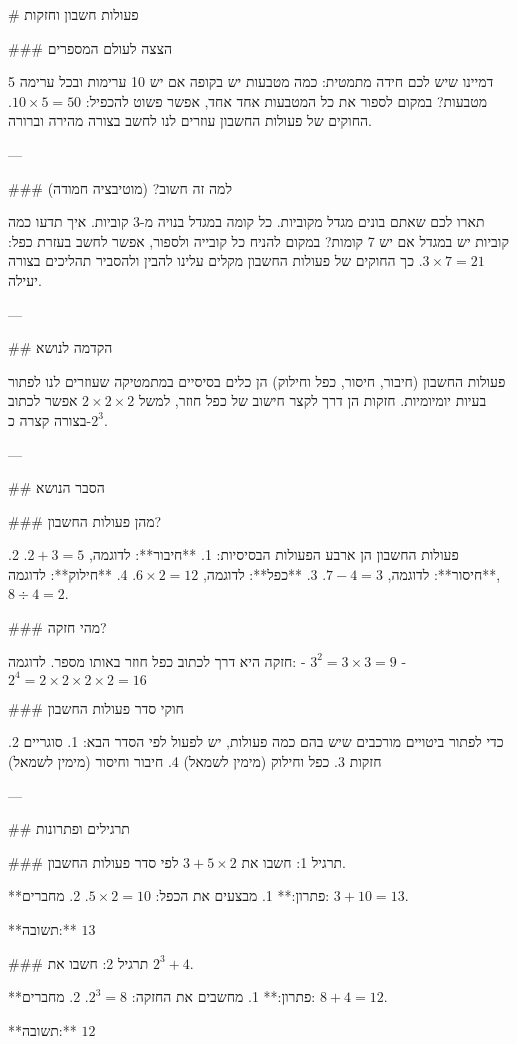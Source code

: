 # פעולות חשבון וחזקות

### הצצה לעולם המספרים

דמיינו שיש לכם חידה מתמטית: כמה מטבעות יש בקופה אם יש 10 ערימות ובכל ערימה 5 מטבעות? במקום לספור את כל המטבעות אחד אחד, אפשר פשוט להכפיל: $10 \times 5 = 50$. החוקים של פעולות החשבון עוזרים לנו לחשב בצורה מהירה וברורה.

---

### למה זה חשוב? (מוטיבציה חמודה)

תארו לכם שאתם בונים מגדל מקוביות. כל קומה במגדל בנויה מ-3 קוביות. איך תדעו כמה קוביות יש במגדל אם יש 7 קומות? במקום להניח כל קובייה ולספור, אפשר לחשב בעזרת כפל: $3 \times 7 = 21$. כך החוקים של פעולות החשבון מקלים עלינו להבין ולהסביר תהליכים בצורה יעילה.

---

## הקדמה לנושא

פעולות החשבון (חיבור, חיסור, כפל וחילוק) הן כלים בסיסיים במתמטיקה שעוזרים לנו לפתור בעיות יומיומיות. חזקות הן דרך לקצר חישוב של כפל חוזר, למשל $2 \times 2 \times 2$ אפשר לכתוב בצורה קצרה כ-$2^3$.

---

## הסבר הנושא

### מהן פעולות החשבון?

פעולות החשבון הן ארבע הפעולות הבסיסיות:
1. **חיבור**: לדוגמה, $2 + 3 = 5$.
2. **חיסור**: לדוגמה, $7 - 4 = 3$.
3. **כפל**: לדוגמה, $6 \times 2 = 12$.
4. **חילוק**: לדוגמה, $8 \div 4 = 2$.

### מהי חזקה?

חזקה היא דרך לכתוב כפל חוזר באותו מספר. לדוגמה:
- $3^2 = 3 \times 3 = 9$
- $2^4 = 2 \times 2 \times 2 \times 2 = 16$

### חוקי סדר פעולות החשבון

כדי לפתור ביטויים מורכבים שיש בהם כמה פעולות, יש לפעול לפי הסדר הבא:
1. סוגריים
2. חזקות
3. כפל וחילוק (מימין לשמאל)
4. חיבור וחיסור (מימין לשמאל)

---

## תרגילים ופתרונות

### תרגיל 1:
חשבו את $3 + 5 \times 2$ לפי סדר פעולות החשבון.

**פתרון:**
1. מבצעים את הכפל: $5 \times 2 = 10$.
2. מחברים: $3 + 10 = 13$.

**תשובה:** $13$

### תרגיל 2:
חשבו את $2^3 + 4$.

**פתרון:**
1. מחשבים את החזקה: $2^3 = 8$.
2. מחברים: $8 + 4 = 12$.

**תשובה:** $12$

